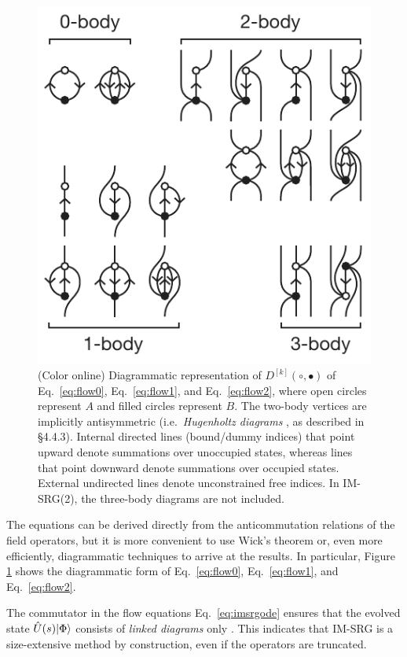 \begin{figure}
\includegraphics{fig-diagrams-imsrg.pdf}
\caption{(Color online) Diagrammatic representation of $D^{[k]}(\circ, \bullet)$ of Eq.\ \eqref{eq:flow0}, Eq.\ \eqref{eq:flow1}, and Eq.\ \eqref{eq:flow2}, where open circles represent $A$ and filled circles represent $B$.  The two-body vertices are implicitly antisymmetric (i.e.\ \textit{Hugenholtz diagrams} \cite{HUGENHOLTZ1957481}, as described in \cite{shavitt2009many} \S 4.4.3).  Internal directed lines (bound/dummy indices) that point upward denote summations over unoccupied states, whereas lines that point downward denote summations over occupied states.  External undirected lines denote unconstrained free indices.  In IM-SRG(2), the three-body diagrams are not included.}
\label{fig:diagrams-imsrg}
\end{figure}

The equations can be derived directly from the anticommutation relations of the field operators, but it is more convenient to use Wick's theorem \cite{PhysRev.80.268} or, even more efficiently, diagrammatic techniques \cite{shavitt2009many} to arrive at the results.  In particular, Figure \ref{fig:diagrams-imsrg} shows the diagrammatic form of Eq.\ \eqref{eq:flow0}, Eq.\ \eqref{eq:flow1}, and Eq.\ \eqref{eq:flow2}.

The commutator in the flow equations Eq.\ \eqref{eq:imsrgode} ensures that the evolved state $\hat U(s) | \Phi \rangle$ consists of \emph{linked diagrams} only \cite{shavitt2009many}.  This indicates that IM-SRG is a size-extensive \cite{ISI:A1981MN73700014} method by construction, even if the operators are truncated.

